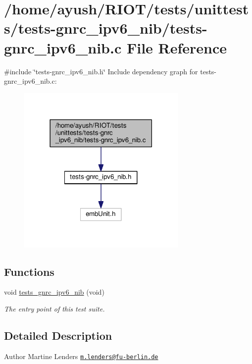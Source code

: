\hypertarget{tests-gnrc__ipv6__nib_8c}{}\section{/home/ayush/\+R\+I\+O\+T/tests/unittests/tests-\/gnrc\+\_\+ipv6\+\_\+nib/tests-\/gnrc\+\_\+ipv6\+\_\+nib.c File Reference}
\label{tests-gnrc__ipv6__nib_8c}
{\ttfamily \#include \char`\"{}tests-\/gnrc\+\_\+ipv6\+\_\+nib.\+h\char`\"{}}\newline
Include dependency graph for tests-\/gnrc\+\_\+ipv6\+\_\+nib.c\+:
\nopagebreak
\begin{figure}[H]
\begin{center}
\leavevmode
\includegraphics[width=234pt]{tests-gnrc__ipv6__nib_8c__incl}
\end{center}
\end{figure}
\subsection*{Functions}
\textbf{ }\par
\begin{DoxyCompactItemize}
\item 
void \hyperlink{group__unittests_ga94ab40380fa6a4f0472a693ef6b5a9c3}{tests\+\_\+gnrc\+\_\+ipv6\+\_\+nib} (void)
\begin{DoxyCompactList}\small\item\em The entry point of this test suite. \end{DoxyCompactList}\end{DoxyCompactItemize}



\subsection{Detailed Description}
\begin{DoxyAuthor}{Author}
Martine Lenders \href{mailto:m.lenders@fu-berlin.de}{\tt m.\+lenders@fu-\/berlin.\+de} 
\end{DoxyAuthor}
